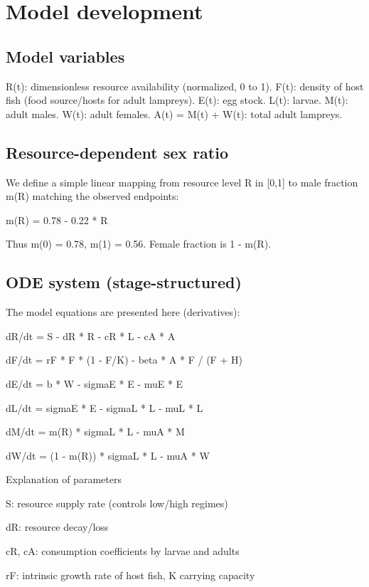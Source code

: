 \documentclass[
]{article}
\begin{document}
\section{Model development}\label{model-development}

\subsection{Model variables}\label{model-variables}

R(t): dimensionless resource availability (normalized, 0 to 1). F(t):
density of host fish (food source/hosts for adult lampreys). E(t): egg
stock. L(t): larvae. M(t): adult males. W(t): adult females. A(t) = M(t)
+ W(t): total adult lampreys.

\subsection{Resource-dependent sex
ratio}\label{resource-dependent-sex-ratio}

We define a simple linear mapping from resource level R in {[}0,1{]} to
male fraction m(R) matching the observed endpoints:

m(R) = 0.78 - 0.22 * R

Thus m(0) = 0.78, m(1) = 0.56. Female fraction is 1 - m(R).

\subsection{ODE system
(stage-structured)}\label{ode-system-stage-structured}

The model equations are presented here (derivatives):

dR/dt = S - dR * R - cR * L - cA * A

dF/dt = rF * F * (1 - F/K) - beta * A * F / (F + H)

dE/dt = b * W - sigmaE * E - muE * E

dL/dt = sigmaE * E - sigmaL * L - muL * L

dM/dt = m(R) * sigmaL * L - muA * M

dW/dt = (1 - m(R)) * sigmaL * L - muA * W

Explanation of parameters

S: resource supply rate (controls low/high regimes)

dR: resource decay/loss

cR, cA: consumption coefficients by larvae and adults

rF: intrinsic growth rate of host fish, K carrying capacity
\end{document}
